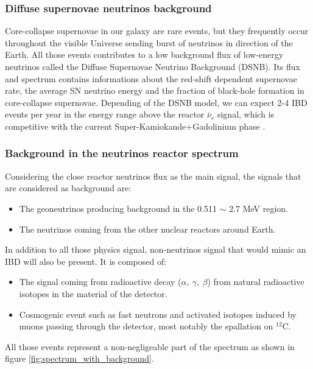 \subsubsection{Diffuse supernovae neutrinos background}

Core-collapse supernovae in our galaxy are rare events, but they frequently occur throughout the visible Universe sending burst of neutrinos in direction of the Earth. All those events contributes to a low background flux of low-energy neutrinos called the Diffuse Supernovae Neutrino Background (DSNB). Its flux and spectrum contains informations about the red-shift dependent supernovae rate, the average SN neutrino energy and the fraction of black-hole formation in core-collapse supernovae. Depending of the DSNB model, we can expect 2-4 IBD events per year in the energy range above the reactor $\bar{\nu}_e$ signal, which is competitive with the current Super-Kamiokande+Gadolinium phase \cite{collaboration_diffuse_2021}.

\subsubsection{Background in the neutrinos reactor spectrum}

Considering the close reactor neutrinos flux as the main signal, the signals that are considered as background are:
\begin{itemize}
  \item The geoneutrinos producing background in the 0.511 $\sim$ 2.7 MeV region.
  \item The neutrinos coming from the other nuclear reactors around Earth.
\end{itemize}
In addition to all those physics signal, non-neutrinos signal that would mimic an IBD will also be present. It is composed of:
\begin{itemize}
  \item The signal coming from radioactive decay ($\alpha, ~ \gamma, ~ \beta$) from natural radioactive isotopes in the material of the detector.
  \item Cosmogenic event such as fast neutrons and activated isotopes induced by muons passing through the detector, most notably the spallation on $^{12}$C.
\end{itemize}
All those events represent a non-negligeable part of the spectrum as shown in figure \ref{fig:spectrum_with_background}.

